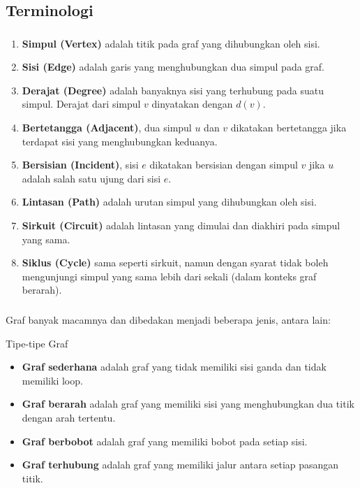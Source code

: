 \documentclass[aspectratio=169]{beamer}
\theoremstyle{definition}
\begin{document}
\subsection{Terminologi}
\begin{frame}
  \frametitle{\insertsection}
  \framesubtitle{\insertsubsection}
  \begin{enumerate}
    \item \textbf{Simpul (Vertex)} adalah titik pada graf yang dihubungkan oleh sisi.
    \item \textbf{Sisi (Edge)} adalah garis yang menghubungkan dua simpul pada graf.
    \item \textbf{Derajat (Degree)} adalah banyaknya sisi yang terhubung pada suatu simpul. Derajat dari simpul $v$ dinyatakan dengan $d(v)$.
    \item \textbf{Bertetangga (Adjacent)}, dua simpul $u$ dan $v$ dikatakan bertetangga jika terdapat sisi yang menghubungkan keduanya.
    \item \textbf{Bersisian (Incident)}, sisi $e$ dikatakan bersisian dengan simpul $v$ jika $u$ adalah salah satu ujung dari sisi $e$.
    \item \textbf{Lintasan (Path)} adalah urutan simpul yang dihubungkan oleh sisi.
    \item \textbf{Sirkuit (Circuit)} adalah lintasan yang dimulai dan diakhiri pada simpul yang sama.
    \item \textbf{Siklus (Cycle)} sama seperti sirkuit, namun dengan syarat tidak boleh mengunjungi simpul yang sama lebih dari sekali (dalam konteks graf berarah).
  \end{enumerate}
\end{frame}

\begin{frame}
  \frametitle{\insertsection}
  \framesubtitle{\insertsubsection}
  Graf banyak macamnya dan dibedakan menjadi beberapa jenis, antara lain:
  \begin{block}{Tipe-tipe Graf}
    \begin{itemize}
      \item \textbf{Graf sederhana} adalah graf yang tidak memiliki sisi ganda dan tidak memiliki loop.
      \item \textbf{Graf berarah} adalah graf yang memiliki sisi yang menghubungkan dua titik dengan arah tertentu.
      \item \textbf{Graf berbobot} adalah graf yang memiliki bobot pada setiap sisi.
      \item \textbf{Graf terhubung} adalah graf yang memiliki jalur antara setiap pasangan titik.
    \end{itemize}
  \end{block}
\end{frame}
\end{document}
